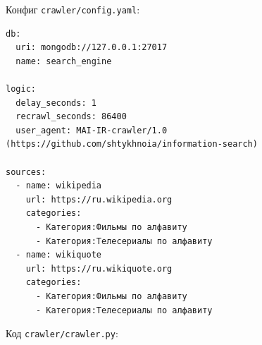 \documentclass[12pt,a4paper,oneside,fleqn]{article}
\begin{document}
Конфиг \texttt{crawler/config.yaml}:

\begin{lstlisting}[language={},numbers=none]
db:
  uri: mongodb://127.0.0.1:27017
  name: search_engine

logic:
  delay_seconds: 1
  recrawl_seconds: 86400
  user_agent: MAI-IR-crawler/1.0 (https://github.com/shtykhnoia/information-search)

sources:
  - name: wikipedia
    url: https://ru.wikipedia.org
    categories:
      - Категория:Фильмы по алфавиту
      - Категория:Телесериалы по алфавиту
  - name: wikiquote
    url: https://ru.wikiquote.org
    categories:
      - Категория:Фильмы по алфавиту
      - Категория:Телесериалы по алфавиту
\end{lstlisting}

Код \texttt{crawler/crawler.py}:
\end{document}
